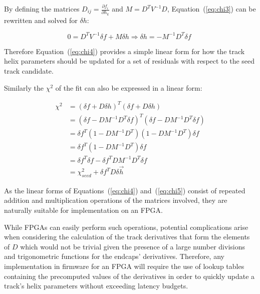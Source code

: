 By defining the matrices $D_{ij} = \frac{\partial f_{i}}{\partial h_{k}}$ and $M = D^{T} V^{-1} D$, Equation~(\ref{eq:chi3}) can be rewritten and solved for $\delta h$:

\begin{equation}
0 = D^{T} V^{-1} \delta f + M \delta h \Rightarrow \delta h = - M^{-1} D^{T} \delta f \;
\label{eq:chi4}
\end{equation}

Therefore Equation~(\ref{eq:chi4}) provides a simple linear form for how the track helix parameters should be updated for a set of residuals with respect to the seed track candidate.

Similarly the $\chi^{2}$ of the fit can also be expressed in a linear form:

\begin{equation}
\begin{split}
\chi^{2} &= (\delta f + D \delta h)^{T}(\delta f + D \delta h) \\
         &= (\delta f - DM^{-1}D^{T}\delta f)^{T} (\delta f - DM^{-1}D^{T}\delta f) \\
         &= \delta f^{T} (1- DM^{-1}D^{T}) (1- DM^{-1}D^{T}) \delta f \\
         &= \delta f^{T} (1- DM^{-1}D^{T}) \delta f \\
         &= \delta f^{T} \delta f - \delta f^{T} DM^{-1}D^{T} \delta f \\
         &= \chi^{2}_{seed} + \delta f^{T} D \delta \overrightarrow{h} 
\end{split}
\label{eq:chi5}
\end{equation}

As the linear forms of Equations~(\ref{eq:chi4}) and~(\ref{eq:chi5}) consist of repeated addition and multiplication operations of the matrices involved, they are naturally suitable for implementation on an FPGA.

While FPGAs can easily perform such operations, potential complications arise when considering the calculation of the track derivatives that form the elements of $D$ which would not be trivial given the presence of a large number divisions and trigonometric functions for the endcaps' derivatives.
Therefore, any implementation in firmware for an FPGA will require the use of lookup tables containing the precomputed values of the derivatives in order to quickly update a track's helix parameters without exceeding latency budgets.

